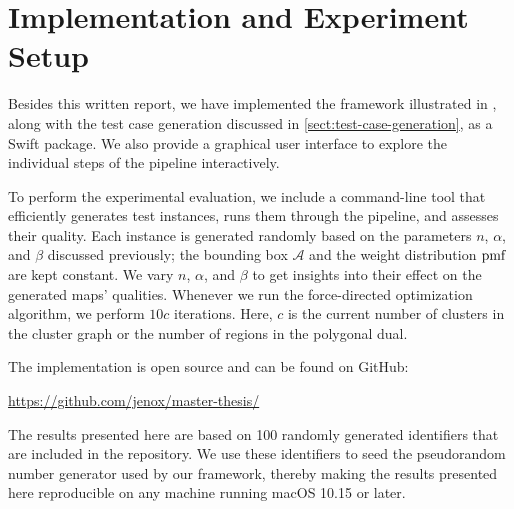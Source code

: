 \section{Implementation and Experiment Setup}
\label{sect:implementation-and-experiment-setup}

Besides this written report, we have implemented the framework illustrated in 
, along with the test case generation discussed in \cref{sect:test-case-generation}, as a Swift package.
We also provide a graphical user interface to explore the individual steps of the pipeline interactively.

To perform the experimental evaluation, we include a command-line tool that efficiently generates test instances, runs them through the pipeline, and assesses their quality.
Each instance is generated randomly based on the parameters $n$, $\alpha$, and $\beta$ discussed previously; the bounding box $\mathcal{A}$ and the weight distribution $\operatorname{pmf}$ are kept constant.
We vary $n$, $\alpha$, and $\beta$ to get insights into their effect on the generated maps' qualities.
Whenever we run the force-directed optimization algorithm, we perform $10c$ iterations.
Here, $c$ is the current number of clusters in the cluster graph or the number of regions in the polygonal dual.

The implementation is open source and can be found on GitHub:
%
\begin{center}
  \url{https://github.com/jenox/master-thesis/}
\end{center}

The results presented here are based on 100 randomly generated identifiers that are included in the repository.
We use these identifiers to seed the pseudorandom number generator used by our framework, thereby making the results presented here reproducible on any machine running macOS 10.15 or later.
